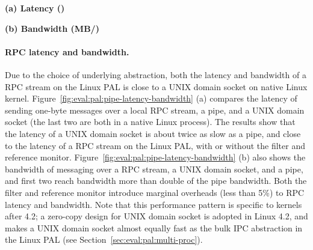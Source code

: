\begin{figure*}[t!]
\centering
\footnotesize
{}
\parbox{0.30\textwidth}{\quad}
\parbox{0.34\textwidth}{\centering\bf (a) Latency ({\usec})}
\parbox{0.34\textwidth}{\centering\bf (b) Bandwidth (MB/\asec{})}
\caption{(a) Latency of sending a short message over RPC (lower is better), and (b) bandwidth of sending large data (higher is better).
The comparison is between (1)  and  over a pipe or an AF\_UNIX socket on Linux; (2)  and  on the Linux PAL, with and without a \seccomp{} filter ({\bf +SC}) and reference monitor ({\bf +RM}); (3) the same \hostapis{} on the SGX PAL, with and without data protection ({\bf +CHK}).}
\label{fig:eval:pal:pipe-latency-bandwidth}
\end{figure*}



\paragraph{RPC latency and bandwidth.}
Due to the choice of underlying abstraction,
both the latency and bandwidth
of a RPC stream on the Linux PAL is close to a UNIX domain socket
on native Linux kernel.
Figure~\ref{fig:eval:pal:pipe-latency-bandwidth} (a)
compares
the latency of sending one-byte messages
over a local RPC stream,
a pipe, and a UNIX domain socket (the last two are both in a native Linux process).
The results
show that the latency of a UNIX domain socket
is about twice as slow as a pipe,
and close to the latency of a RPC stream
on the Linux PAL,
with or without the \seccomp{} filter and reference monitor.
Figure~\ref{fig:eval:pal:pipe-latency-bandwidth} (b)
also shows the bandwidth
of messaging over a RPC stream, a UNIX domain socket,
and a pipe,
and first two reach bandwidth
more than double of the pipe bandwidth.
Both the \seccomp{} filter and reference monitor introduce marginal overheads (less than 5\%) to RPC latency and bandwidth.
Note that this performance pattern is specific
to kernels after 4.2; a zero-copy design for UNIX domain socket
is adopted in Linux 4.2,
and makes a UNIX domain socket
almost equally fast as the bulk IPC abstraction
in the Linux PAL
(see Section~\ref{sec:eval:pal:multi-proc}). 



